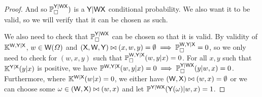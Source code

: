 \begin{proof}
And so $\mathbb{P}_\square^{\mathsf{Y}|\mathsf{WX}})$ is a $\mathsf{Y}|\mathsf{WX}$ conditional probability. We also want it to be valid, so we will verify that it can be chosen as such.

We also need to check that $\mathbb{P}_\square^{\mathsf{Y}|\mathsf{WX}}$ can be chosen so that it is valid. By validity of $\mathbb{K}^{\mathsf{W,Y}|\mathsf{X}}$, $w\in \mathsf{W}(\Omega)$ and $(\mathsf{X},\mathsf{W},\mathsf{Y})\bowtie(x,w,y)=\emptyset \implies \mathbb{P}_\square^{\mathsf{W,Y}|\mathsf{X}}=0$, so we only need to check for $(w,x,y)$ such that $\mathbb{P}_\square^{\mathsf{W,Y}|\mathsf{X}}(w,y|x)=0$. For all $x,y$ such that $\mathbb{K}^{\mathsf{Y}|\mathsf{X}}(y|x)$ is positive, we have $\mathbb{P}^{\mathsf{W,Y}|\mathsf{X}}(w,y|x)=0\implies \mathbb{P}_\square^{\mathsf{Y}|\mathsf{WX}}(y|w,x)=0$. Furthermore, where $\mathbb{K}^{\mathsf{W}|\mathsf{X}}(w|x)=0$, we either have $(\mathsf{W},\mathsf{X})\bowtie(w,x)=\emptyset$ or we can choose some $\omega\in (\mathsf{W},\mathsf{X})\bowtie(w,x)$ and let $\mathbb{P}^{\mathsf{Y}|\mathsf{WX}}(\mathsf{Y}(\omega)|w,x) = 1$.
\end{proof}
